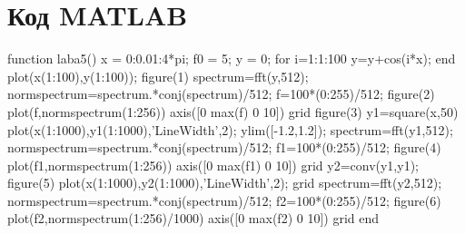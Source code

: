 \documentclass[10pt,a4paper]{report}
\begin{document}
\section{Код MATLAB}
function laba5()\newline
x = 0:0.01:4*pi;\newline
f0 = 5;\newline
y = 0;\newline
for i=1:1:100\newline
    y=y+cos(i*x);\newline
end\newline
plot(x(1:100),y(1:100));\newline
figure(1)\newline
spectrum=fft(y,512);\newline
normspectrum=spectrum.*conj(spectrum)/512;\newline
f=100*(0:255)/512;\newline
figure(2)\newline
plot(f,normspectrum(1:256))\newline
axis([0 max(f) 0 10])\newline
grid \newline
figure(3)\newline
y1=square(x,50)\newline
plot(x(1:1000),y1(1:1000),'LineWidth',2);\newline
ylim([-1.2,1.2]);\newline
spectrum=fft(y1,512);\newline
normspectrum=spectrum.*conj(spectrum)/512;\newline
f1=100*(0:255)/512;\newline
figure(4)\newline
plot(f1,normspectrum(1:256))\newline
axis([0 max(f1) 0 10])\newline
grid \newline
y2=conv(y1,y1);\newline
figure(5)\newline
plot(x(1:1000),y2(1:1000),'LineWidth',2);\newline
grid\newline
spectrum=fft(y2,512);\newline
normspectrum=spectrum.*conj(spectrum)/512;\newline
f2=100*(0:255)/512;\newline
figure(6)\newline
plot(f2,normspectrum(1:256)/1000)\newline
axis([0 max(f2) 0 10])\newline
grid \newline
end\newline
\clearpage
\end{document}
